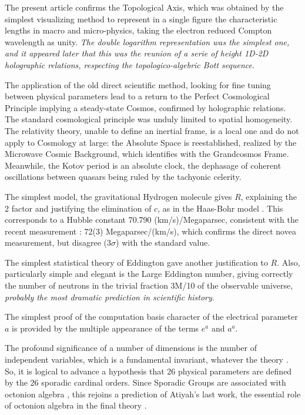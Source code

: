 \documentclass[twoside,draft]{article}
\begin{document}
\begin{sloppypar}
The present article confirms the Topological Axis, which was obtained by the simplest visualizing method to represent in a single figure the characteristic lengths in macro and micro-physics, taking the electron reduced Compton wavelength as unity. \textit {The double logarithm representation was the simplest one, and it appeared later that this was the reunion of a serie of height 1D-2D holographic relations, respecting the topologico-algebric Bott sequence}.

The application of the old direct scientific method, looking for fine tuning between physical parameters lead to a return to the Perfect Cosmological Principle implying a steady-state Cosmos, confirmed by holographic relations. The standard cosmological principle was unduly limited to spatial homogeneity. The relativity theory, unable to define an inertial frame, is a local one and do not apply to Cosmology at large: the Absolute Space is reestablished, realized by the Microwave Cosmic Background, which identifies with the Grandcosmos Frame. Meanwhile, the Kotov period is an absolute clock, the dephasage of coherent oscillations between quasars being ruled by the tachyonic celerity.

The simplest model, the gravitational Hydrogen molecule gives $R$, explaining the 2 factor and
justifying the elimination of $c$, as in the Haas-Bohr model \cite{Sanchez1}. This corresponds to a Hubble constant 70.790
(km/s)/Megaparsec, consistent with the recent measurement \cite{Bonvin}: 72(3) Megaparsec/(km/s), which
confirms the direct novea measurement, but disagree (3$\sigma$) with the standard value.

The simplest statistical theory of Eddington gave another justification to $R$. Also, particularly
simple and elegant is the Large Eddington number, giving correctly the number of neutrons in the
trivial fraction 3M/10 of the observable universe, \textit{probably the most dramatic prediction in
 scientific history}.

The simplest proof of the computation basis character of the electrical parameter $a$ is provided
by the multiple appearance of the terms $e^{a}$ and $a^{a}$.

The profound significance of a number of dimensions is the number of independent variables,
which is a fundamental invariant, whatever the theory \cite{Weigel}. So, it is logical to advance a
hypothesis that 26 physical parameters are defined by the 26 sporadic cardinal orders. Since
Sporadic Groups are associated with octonion algebra \cite{Atiyah2}, this rejoins a prediction of Atiyah's last
work, the essential role of octonion algebra in the final theory \cite{Atiyah1}.


\end{sloppypar}
\end{document}
